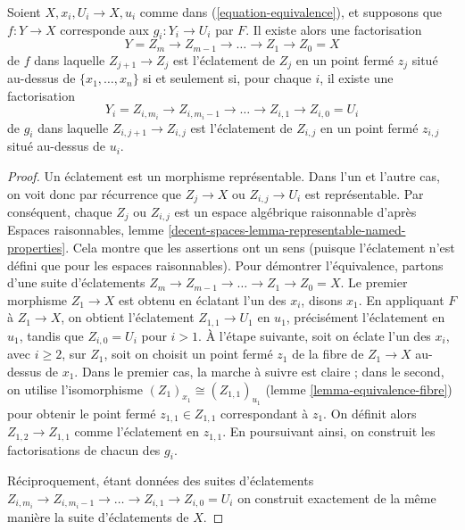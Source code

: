 \begin{lemma}
\label{lemma-equivalence-sequence-blowups}
Soient $X, x_i, U_i \to X, u_i$ comme dans
(\ref{equation-equivalence}), et supposons que $f : Y \to X$ corresponde aux
$g_i : Y_i \to U_i$ par $F$. Il existe alors une factorisation
$$
Y = Z_m \to Z_{m - 1} \to \ldots \to Z_1 \to Z_0 = X
$$
de $f$ dans laquelle $Z_{j + 1} \to Z_j$ est l'éclatement de $Z_j$ en un
point fermé $z_j$ situé au-dessus de $\{x_1, \ldots, x_n\}$ si et seulement
si, pour chaque $i$, il existe une factorisation
$$
Y_i = Z_{i, m_i} \to Z_{i, m_i - 1} \to \ldots \to Z_{i, 1} \to Z_{i, 0} = U_i
$$
de $g_i$ dans laquelle $Z_{i, j + 1} \to Z_{i, j}$ est l'éclatement de
$Z_{i, j}$ en un point fermé $z_{i, j}$ situé au-dessus de $u_i$.
\end{lemma}

\begin{proof}
Un éclatement est un morphisme représentable. Dans l'un et l'autre cas,
on voit donc par récurrence que $Z_j \to X$ ou $Z_{i, j} \to U_i$ est
représentable. Par conséquent, chaque $Z_j$ ou $Z_{i, j}$ est un espace
algébrique raisonnable d'après Espaces raisonnables, lemme
\ref{decent-spaces-lemma-representable-named-properties}.
Cela montre que les assertions ont un sens (puisque l'éclatement n'est défini
que pour les espaces raisonnables).
Pour démontrer l'équivalence, partons d'une suite d'éclatements
$Z_m \to Z_{m - 1} \to \ldots \to Z_1 \to Z_0 = X$.
Le premier morphisme $Z_1 \to X$ est obtenu en éclatant l'un des $x_i$,
disons $x_1$. En appliquant $F$ à $Z_1 \to X$, on obtient l'éclatement
$Z_{1, 1} \to U_1$ en $u_1$, précisément l'éclatement en $u_1$, tandis que
$Z_{i, 0} = U_i$ pour $i > 1$.
À l'étape suivante, soit on éclate l'un des $x_i$, avec $i \geq 2$, sur
$Z_1$, soit on choisit un point fermé $z_1$ de la fibre de $Z_1 \to X$
au-dessus de $x_1$. Dans le premier cas, la marche à suivre est claire ;
dans le second, on utilise l'isomorphisme
$(Z_1)_{x_1} \cong (Z_{1, 1})_{u_1}$
(lemme \ref{lemma-equivalence-fibre}) pour obtenir le point fermé
$z_{1, 1} \in Z_{1, 1}$ correspondant à $z_1$. On définit alors
$Z_{1, 2} \to Z_{1, 1}$ comme l'éclatement en $z_{1, 1}$. En poursuivant
ainsi, on construit les factorisations de chacun des $g_i$.

\medskip\noindent
Réciproquement, étant données des suites d'éclatements
$Z_{i, m_i} \to Z_{i, m_i - 1} \to \ldots \to Z_{i, 1} \to Z_{i, 0} = U_i$
on construit exactement de la même manière la suite d'éclatements de $X$.
\end{proof}

